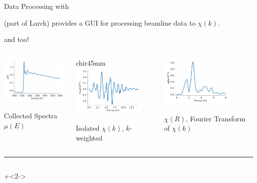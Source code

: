 \begin{slide}{Data Processing with {\xasviewer}  }

  \begin{cenpage}{135mm}
  {\xasviewer} (part of Larch) provides a GUI for
  processing beamline data to $\chi(k)$.

  \vmm
  {\athena} and {\sixpack} too!

  \begin{columns}
    \begin{column}{45mm}

      \includegraphics[width=35mm]{figs/experiment/feo_mu}

      \vmm
      Collected Spectra $\mu(E)$

    \end{column}
    \begin{column}{chir45mm}
      \includegraphics[width=35mm]{figs/experiment/feo_chik}

      \vmm
      Isolated $\chi(k)$, $k$-weighted

    \end{column}
    \begin{column}{45mm}
      \includegraphics[width=35mm]{figs/experiment/feo_chir}

      \vmm
      $\chi(R)$, Fourier Transform of $\chi(k)$

    \end{column}
  \end{columns}

  \vmm \hrule

  \vmm\vmm

{\small{
  \begin{columns}[T]
    \begin{column}{65mm}
      \onslide+<2->


\end{column}
\end{columns}}}
\end{cenpage}
\end{slide}
